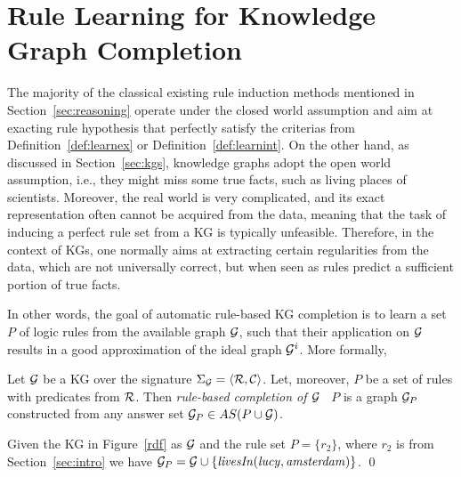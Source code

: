 \section{ Rule Learning for Knowledge Graph Completion}
\label{sec:rules_kg_completion}
The majority of the classical existing rule induction methods mentioned in Section~\ref{sec:reasoning} operate under the closed world assumption and aim at exacting rule hypothesis that perfectly satisfy the criterias from Definition~\ref{def:learnex} or Definition~\ref{def:learnint}.
On the other hand, as discussed in Section~\ref{sec:kgs}, knowledge graphs adopt the open world assumption, i.e., they might miss some true facts, such as living places of scientists. Moreover, the real world is very complicated, and its exact representation often cannot be acquired from the data, meaning that the task of inducing a perfect rule set from a KG is typically unfeasible. Therefore, in the context of KGs, one normally aims at extracting certain regularities from the data, which are not universally correct, but when seen as rules predict a sufficient portion of true facts. 

In other words, the goal of automatic rule-based KG completion is to learn a set $P$ of logic rules from the available graph $\mathcal{G}$, such that their application on $\mathcal{G}$ results in a good approximation of the ideal graph $\mathcal{G}^i$. More formally,



 \begin{definition}\label{def:kgcomp} Let $\mathcal{G}$ be a KG  over the signature $\Sigma_{\mathcal{G}}=\langle\mathcal{R},\mathcal{C}\rangle$. Let, moreover, $P$ be a set of rules with predicates from $\mathcal{R}$. 
 Then \emph{rule-based completion of $\mathcal{G}$ \wrt\ $P$} is a graph $\mathcal{G}_{P}$ constructed from any answer set $\mathcal{G}_{P}\in AS(P \cup \mathcal{G})$. 
 \end{definition}
 
 \begin{example}
 Given the KG in Figure~\ref{rdf} as $\mathcal{G}$ and the rule set $P=\{r_2\}$, where $r_2$ is from Section~\ref{sec:intro} 
 we have $\mathcal{G}_{P}=\mathcal{G} \cup \{\mathit{livesIn(lucy,amsterdam)}\}$. \qed
 \end{example}

